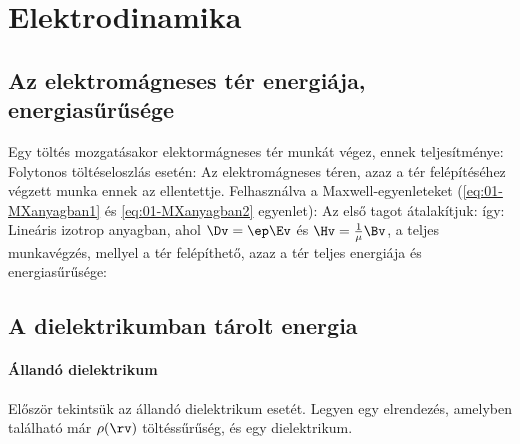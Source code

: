  \section{Elektrodinamika}
  
  \subsection{Az elektromágneses tér energiája, energiasűrűsége}\label{ss-7:elterenergia}
   
   Egy töltés mozgatásakor elektormágneses tér munkát végez, ennek teljesítménye:
   Folytonos töltéseloszlás esetén:
   Az elektromágneses téren, azaz a tér felépítéséhez végzett munka ennek az ellentettje.
   Felhasználva a Maxwell-egyenleteket (\eqref{eq:01-MXanyagban1} és \eqref{eq:01-MXanyagban2} egyenlet):
   Az első tagot átalakítjuk:
   így:
   Lineáris izotrop anyagban, ahol $\Dv=\ep\Ev$ és $\Hv=\frac{1}{\mu}\Bv$, a teljes munkavégzés, mellyel a tér felépíthető, azaz a tér teljes energiája és energiasűrűsége:
   
  \subsection{A dielektrikumban tárolt energia}
   
   \paragraph{Állandó dielektrikum}
    Először tekintsük az állandó dielektrikum esetét.
   Legyen egy elrendezés, amelyben található már $\rho(\rv)$ töltéssűrűség, és egy dielektrikum.
    
